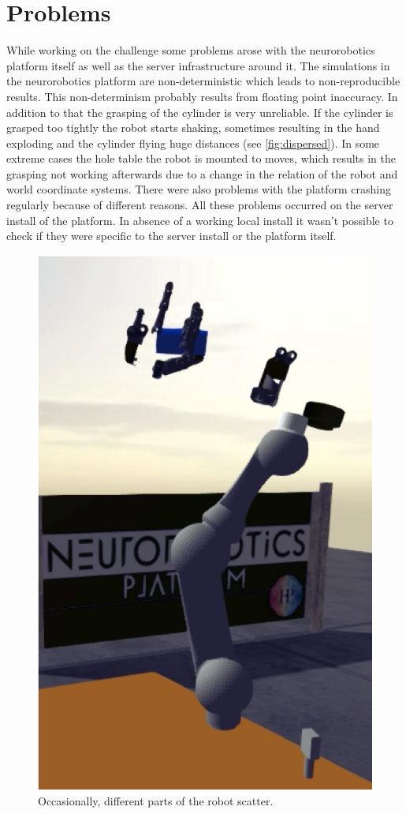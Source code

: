 \section{Problems}\label{sec:problems}
While working on the challenge some problems arose with the neurorobotics platform itself as well as the server infrastructure around it.
The simulations in the neurorobotics platform are non-deterministic which leads to non-reproducible results.
This non-determinism probably results from floating point inaccuracy.
In addition to that the grasping of the cylinder is very unreliable.
If the cylinder is grasped too tightly the robot starts shaking, sometimes resulting in the hand exploding and the cylinder flying huge distances (see \autoref{fig:dispersed}).
In some extreme cases the hole table the robot is mounted to moves, which results in the grasping not working afterwards due to a change in the relation of the robot and world coordinate systems.
There were also problems with the platform crashing regularly because of different reasons.
All these problems occurred on the server install of the platform.
In absence of a working local install it wasn't possible to check if they were specific to the server install or the platform itself.

\begin{figure}[h]
\centering
\includegraphics[width=.95\columnwidth]{figures/dispersed_robot.png}
\caption{Occasionally, different parts of the robot scatter.}
\label{fig:dispersed}
\end{figure}